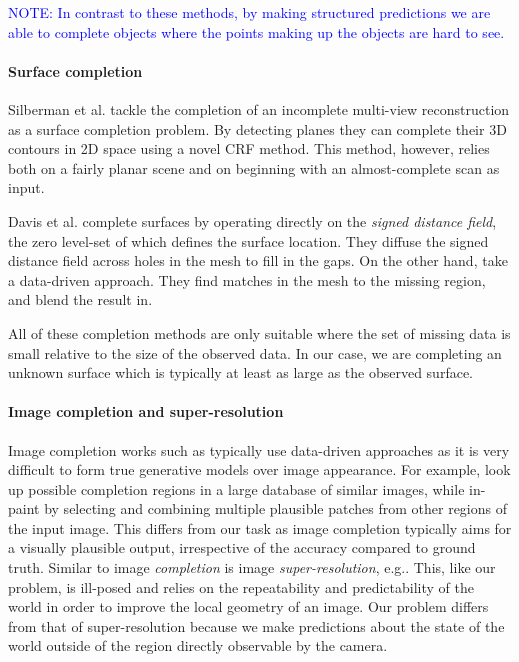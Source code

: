 \documentclass[10pt,twocolumn,letterpaper]{article}
\makeatletter
\renewcommand*{\eg}{e.g.\@\xspace}
\newcommand*{\ea}{et al.\@\xspace}
\newcommand{\note}[1]{\textcolor{blue}{NOTE: #1}}
\makeatother
\begin{document}
\note{In contrast to these methods, by making structured predictions we are able to complete objects where the points making up the objects are hard to see.}



\paragraph{Surface completion}

Silberman \ea \cite{silberman-eccv-2014} tackle the completion of an incomplete multi-view reconstruction as a surface completion problem.
By detecting planes they can complete their 3D contours in 2D space using a novel CRF method.
This method, however, relies both on a fairly planar scene and on beginning with an almost-complete scan as input.

Davis \ea \cite{davis-3dpvt-2002} complete surfaces by operating directly on the \emph{signed distance field}, the zero level-set of which defines the surface location. They diffuse the signed distance field across holes in the mesh to fill in the gaps.
On the other hand, \cite{harary-tog-2013} take a data-driven approach.
They find matches in the mesh to the missing region, and blend the result in.

All of these completion methods are only suitable where the set of missing data is small relative to the size of the observed data.
In our case, we are completing an unknown surface which is typically at least as large as the observed surface.



\paragraph{Image completion and super-resolution}

Image completion works such as \cite{hays-siggraph-2007, criminisi-cvpr-2003}
typically use data-driven approaches as it is very difficult to form true generative models over image appearance.
For example, \cite{hays-siggraph-2007} look up possible completion regions in a large database of similar images, while \cite{criminisi-cvpr-2003} in-paint by selecting and combining multiple plausible patches from other regions of the input image.
This differs from our task as image completion typically aims for a visually plausible output, irrespective of the accuracy compared to ground truth.
Similar to image \emph{completion} is image \emph{super-resolution}, \eg \cite{macaodha-eccv-2012}. 
This, like our problem, is ill-posed and relies on the repeatability and predictability of the world in order to improve the local geometry of an image.
Our problem differs from that of super-resolution because we make predictions about the state of the world outside of the region directly observable by the camera.
\end{document}
